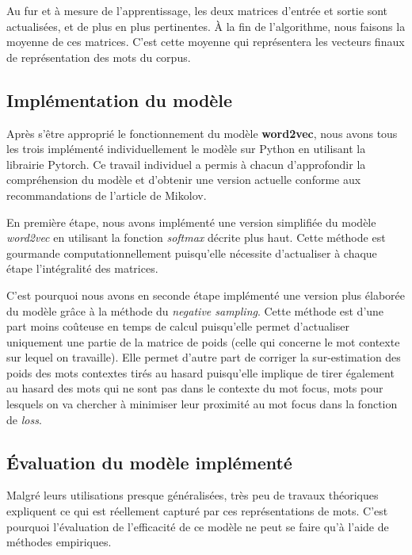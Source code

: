 \documentclass[11pt,french,french]{article}
\begin{document}
Au fur et à mesure de l'apprentissage, les deux matrices d'entrée et
sortie sont actualisées, et de plus en plus pertinentes. À la fin de
l'algorithme, nous faisons la moyenne de ces matrices. C'est cette
moyenne qui représentera les vecteurs finaux de représentation des mots
du corpus.

\hypertarget{impluxe9mentation-du-moduxe8le}{%
\subsection{Implémentation du
modèle}\label{impluxe9mentation-du-moduxe8le}}

Après s'être approprié le fonctionnement du modèle \textbf{word2vec},
nous avons tous les trois implémenté individuellement le modèle sur
Python en utilisant la librairie Pytorch. Ce travail individuel a permis
à chacun d'approfondir la compréhension du modèle et d'obtenir une
version actuelle conforme aux recommandations de l'article de Mikolov.

En première étape, nous avons implémenté une version simplifiée du
modèle \emph{word2vec} en utilisant la fonction \emph{softmax} décrite
plus haut. Cette méthode est gourmande computationnellement puisqu'elle
nécessite d'actualiser à chaque étape l'intégralité des matrices.

C'est pourquoi nous avons en seconde étape implémenté une version plus
élaborée du modèle grâce à la méthode du \emph{negative sampling}. Cette
méthode est d'une part moins coûteuse en temps de calcul puisqu'elle
permet d'actualiser uniquement une partie de la matrice de poids (celle
qui concerne le mot contexte sur lequel on travaille). Elle permet
d'autre part de corriger la sur-estimation des poids des mots contextes
tirés au hasard puisqu'elle implique de tirer également au hasard des
mots qui ne sont pas dans le contexte du mot focus, mots pour lesquels
on va chercher à minimiser leur proximité au mot focus dans la fonction
de \emph{loss}.

\hypertarget{uxe9valuation-du-moduxe8le-impluxe9mentuxe9}{%
\subsection{Évaluation du modèle
implémenté}\label{uxe9valuation-du-moduxe8le-impluxe9mentuxe9}}

Malgré leurs utilisations presque généralisées, très peu de travaux
théoriques expliquent ce qui est réellement capturé par ces
représentations de mots. C'est pourquoi l'évaluation de l'efficacité de
ce modèle ne peut se faire qu'à l'aide de méthodes empiriques.
\end{document}
